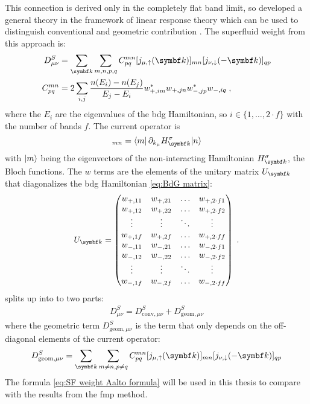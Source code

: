 \documentclass[../main.tex]{subfiles}
\begin{document}
This connection is derived only in the completely flat band limit, so \citeauthor{liangBandGeometryBerry2017} developed a general theory in the framework of linear response theory which can be used to distinguish conventional and geometric contribution \cite{liangBandGeometryBerry2017}.
The superfluid weight from this approach is:
\begin{align}
	D^S_{\mu \nu} &= \sum_{\vb{k}} \sum_{m, n, p, q} C_{pq}^{mn} [j_{\mu, \uparrow} (\vb{k})]_{mn} [j_{\nu, \downarrow} (-\vb{k})]_{qp} \label{eq:SF weight Aalto formula} \\
	C_{pq}^{mn} &= 2 \sum_{i, j} \frac{n(E_i) - n(E_j)}{E_j - E_i} w_{+, im}^* w_{+, jn} w_{-, jp}^* w_{-, iq}\;,
\end{align}
where the \(E_i\) are the eigenvalues of the \gls{bdg} Hamiltonian, so \(i \in \{1, \ldots, 2 \cdot f\}\) with the number of bands \(f\).
The current operator is
\begin{equation}
	[j_{\mu, \sigma} (\vb{k})]_{mn} = \braket{m \vert \pdif{k_{\mu}} H^{\sigma}_{\vb{k}} \vert n}
\end{equation}
with \(\ket{m}\) being the eigenvectors of the non-interacting Hamiltonian \(H^{\sigma}_{\vb{k}}\), the Bloch functions.
The \(w\) terms are the elements of the unitary matrix \(U_{\vb{k}}\) that diagonalizes the \gls{bdg} Hamiltonian \cref{eq:BdG matrix}:
\begin{equation}
	U_{\vb{k}} = \begin{pmatrix}
		w_{+, 11} & w_{+, 21} &\ldots & w_{+, 2\cdot f 1} \\
		w_{+, 12} & w_{+, 22} &\ldots & w_{+, 2\cdot f 2} \\
		\vdots    & \vdots    &\ddots & \vdots \\
		w_{+, 1f} & w_{+, 2f} &\ldots & w_{+, 2\cdot f f} \\
		w_{-, 11} & w_{-, 21} &\ldots & w_{-, 2\cdot f 1} \\
		w_{-, 12} & w_{-, 22} &\ldots & w_{-, 2\cdot f 2} \\
		\vdots    & \vdots    &\ddots & \vdots \\
		w_{-, 1f} & w_{-, 2f} &\ldots & w_{-, 2\cdot f f}
	\end{pmatrix}\;.
\end{equation}
 splits up into to two parts:
\begin{align}
	D^S_{\mu \nu} = D^S_{\mathrm{conv}, \mu \nu} + D^S_{\mathrm{geom}, \mu \nu}
\end{align}
where the geometric term \(D^S_{\mathrm{geom}, \mu \nu}\) is the term that only depends on the off-diagonal elements of the current operator:
\begin{equation}
	D^S_{\mathrm{geom}, \mu \nu} = \sum_{\vb{k}} \sum_{m \neq n, p \neq q} C_{pq}^{mn} [j_{\mu, \uparrow} (\vb{k})]_{mn} [j_{\nu, \downarrow} (-\vb{k})]_{qp}
\end{equation}
The formula \cref{eq:SF weight Aalto formula}  will be used in this thesis to compare with the results from the \gls{fmp} method.
\end{document}
